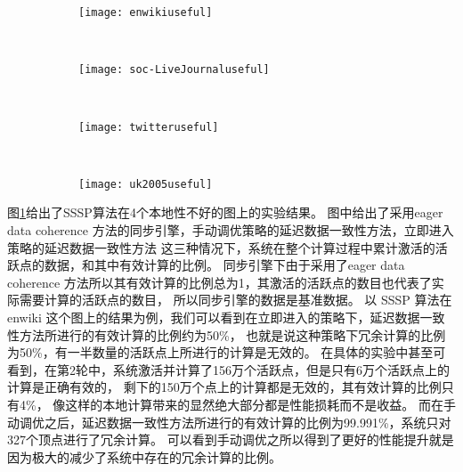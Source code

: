 \begin{figure}[!htbp]
  \centering
  \begin{subfigure}[b]{0.4\textwidth}
    \texttt{[image: enwikiuseful]}
    \caption{}
  \end{subfigure}%
  ~%
  \begin{subfigure}[b]{0.4\textwidth}
    \texttt{[image: soc-LiveJournaluseful]}
    \caption{}
  \end{subfigure}
  \\%
  \begin{subfigure}[b]{0.4\textwidth}
    \texttt{[image: twitteruseful]}
    \caption{}
  \end{subfigure}%
  ~%
  \begin{subfigure}[b]{0.4\textwidth}
    \texttt{[image: uk2005useful]}
    \caption{}
  \end{subfigure}
  \label{fig:useful}
\end{figure}
图\ref{fig:useful}给出了SSSP算法在4个本地性不好的图上的实验结果。
图中给出了采用eager data coherence 方法的同步引擎，手动调优策略的延迟数据一致性方法，立即进入策略的延迟数据一致性方法
这三种情况下，系统在整个计算过程中累计激活的活跃点的数据，和其中有效计算的比例。
同步引擎下由于采用了eager data coherence 方法所以其有效计算的比例总为1，其激活的活跃点的数目也代表了实际需要计算的活跃点的数目，
所以同步引擎的数据是基准数据。
以 SSSP 算法在 enwiki 这个图上的结果为例，我们可以看到在立即进入的策略下，延迟数据一致性方法所进行的有效计算的比例约为50\%，
也就是说这种策略下冗余计算的比例为50\%，有一半数量的活跃点上所进行的计算是无效的。
在具体的实验中甚至可看到，在第2轮中，系统激活并计算了156万个活跃点，但是只有6万个活跃点上的计算是正确有效的，
剩下的150万个点上的计算都是无效的，其有效计算的比例只有4\%，
像这样的本地计算带来的显然绝大部分都是性能损耗而不是收益。
而在手动调优之后，延迟数据一致性方法所进行的有效计算的比例为99.991\%，系统只对327个顶点进行了冗余计算。
可以看到手动调优之所以得到了更好的性能提升就是因为极大的减少了系统中存在的冗余计算的比例。


